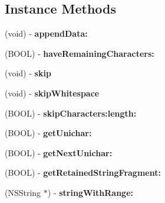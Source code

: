 \subsection*{Instance Methods}
\begin{DoxyCompactItemize}
\item 
\hypertarget{interface_s_b_json_u_t_f8_stream_a64b3d20e0373bfbb5bd2dd29b1b1919f}{(void) -\/ {\bfseries append\-Data\-:}}\label{interface_s_b_json_u_t_f8_stream_a64b3d20e0373bfbb5bd2dd29b1b1919f}

\item 
\hypertarget{interface_s_b_json_u_t_f8_stream_acf91817d2bd973b1f8b2cb828bc9e5f2}{(B\-O\-O\-L) -\/ {\bfseries have\-Remaining\-Characters\-:}}\label{interface_s_b_json_u_t_f8_stream_acf91817d2bd973b1f8b2cb828bc9e5f2}

\item 
\hypertarget{interface_s_b_json_u_t_f8_stream_aa3bb83bf9ee2ebc7d8eed0cbcd35729f}{(void) -\/ {\bfseries skip}}\label{interface_s_b_json_u_t_f8_stream_aa3bb83bf9ee2ebc7d8eed0cbcd35729f}

\item 
\hypertarget{interface_s_b_json_u_t_f8_stream_a724e347ce0f65d66276e978f5e8dd2d2}{(void) -\/ {\bfseries skip\-Whitespace}}\label{interface_s_b_json_u_t_f8_stream_a724e347ce0f65d66276e978f5e8dd2d2}

\item 
\hypertarget{interface_s_b_json_u_t_f8_stream_acdbfede2e91d9eba153d707be4f37d27}{(B\-O\-O\-L) -\/ {\bfseries skip\-Characters\-:length\-:}}\label{interface_s_b_json_u_t_f8_stream_acdbfede2e91d9eba153d707be4f37d27}

\item 
\hypertarget{interface_s_b_json_u_t_f8_stream_a74153b4e039bcb2626a6162b8c9024c1}{(B\-O\-O\-L) -\/ {\bfseries get\-Unichar\-:}}\label{interface_s_b_json_u_t_f8_stream_a74153b4e039bcb2626a6162b8c9024c1}

\item 
\hypertarget{interface_s_b_json_u_t_f8_stream_a0a813e17d9a1e2638a8d5a58a524b055}{(B\-O\-O\-L) -\/ {\bfseries get\-Next\-Unichar\-:}}\label{interface_s_b_json_u_t_f8_stream_a0a813e17d9a1e2638a8d5a58a524b055}

\item 
\hypertarget{interface_s_b_json_u_t_f8_stream_a221bf94fb45b3c2c73c6f04bb7d06b26}{(B\-O\-O\-L) -\/ {\bfseries get\-Retained\-String\-Fragment\-:}}\label{interface_s_b_json_u_t_f8_stream_a221bf94fb45b3c2c73c6f04bb7d06b26}

\item 
\hypertarget{interface_s_b_json_u_t_f8_stream_a1069f840be77cd74bd1d38cbdcb2146c}{(N\-S\-String $\ast$) -\/ {\bfseries string\-With\-Range\-:}}\label{interface_s_b_json_u_t_f8_stream_a1069f840be77cd74bd1d38cbdcb2146c}

\end{DoxyCompactItemize}
